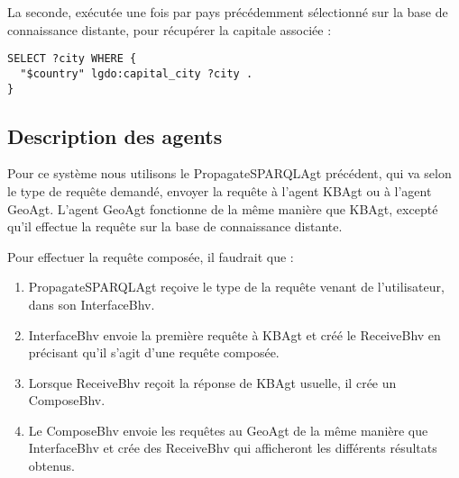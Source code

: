 \documentclass[a4paper,11pt]{article}
\begin{document}
La seconde, exécutée une fois par pays précédemment sélectionné sur la base de connaissance distante, pour récupérer la capitale associée :
\begin{lstlisting}[language=SPARQL]
SELECT ?city WHERE { 
  "$country" lgdo:capital_city ?city .
} 
\end{lstlisting}
\subsection{Description des agents}
Pour ce système nous utilisons le PropagateSPARQLAgt précédent, qui va selon le type de requête demandé, envoyer la requête à l'agent KBAgt ou à l'agent GeoAgt.
L'agent GeoAgt fonctionne de la même manière que KBAgt, excepté qu'il effectue la requête sur la base de connaissance distante.

Pour effectuer la requête composée, il faudrait que :
\begin{enumerate}
\item PropagateSPARQLAgt reçoive le type de la requête venant de l'utilisateur, dans son InterfaceBhv.
\item InterfaceBhv envoie la première requête à KBAgt et créé le ReceiveBhv en précisant qu'il s'agit d'une requête composée. 
\item Lorsque ReceiveBhv reçoit la réponse de KBAgt usuelle, il crée un ComposeBhv.
\item Le ComposeBhv envoie les requêtes au GeoAgt de la même manière que InterfaceBhv et crée des ReceiveBhv qui afficheront les différents résultats obtenus.
\end{enumerate}
 
\end{document}
